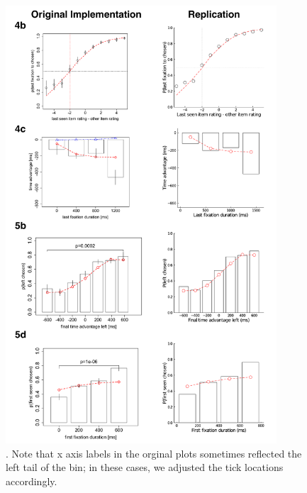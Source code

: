 \begin{figure}[tb!]
  \centering
  \includegraphics[width=0.9\textwidth]{figs/attention/supp-addm-replication-binary.pdf}
  \caption{.
    Note that x axis labels in the orginal plots sometimes reflected the left tail of the bin; in these cases, we adjusted the tick locations accordingly.
  }
  \label{fig:attention-addm2}
\end{figure}

